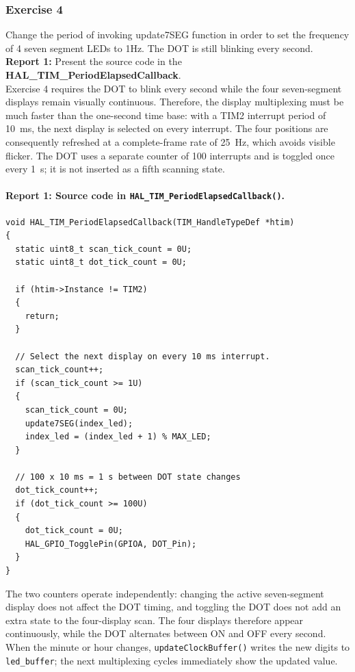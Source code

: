 \subsubsection{Exercise 4}

Change the period of invoking update7SEG function in order to set the frequency of 4 seven segment LEDs to 1Hz. The DOT is still blinking every second.\\

\textbf{Report 1: } Present the source code in the \textbf{HAL\_TIM\_PeriodElapsedCallback}. \\

Exercise 4 requires the DOT to blink every second while the four seven-segment displays remain visually continuous. Therefore, the display multiplexing must be much faster than the one-second time base: with a TIM2 interrupt period of \SI{10}{ms}, the next display is selected on every interrupt. The four positions are consequently refreshed at a complete-frame rate of \SI{25}{Hz}, which avoids visible flicker. The DOT uses a separate counter of 100 interrupts and is toggled once every \SI{1}{s}; it is not inserted as a fifth scanning state.

\paragraph{Report 1: Source code in \texttt{HAL\_TIM\_PeriodElapsedCallback()}.}

\begin{lstlisting}[caption={Fast four-display multiplexing and a DOT toggled every second}]
void HAL_TIM_PeriodElapsedCallback(TIM_HandleTypeDef *htim)
{
  static uint8_t scan_tick_count = 0U;
  static uint8_t dot_tick_count = 0U;

  if (htim->Instance != TIM2)
  {
    return;
  }

  // Select the next display on every 10 ms interrupt.
  scan_tick_count++;
  if (scan_tick_count >= 1U)
  {
    scan_tick_count = 0U;
    update7SEG(index_led);
    index_led = (index_led + 1) % MAX_LED;
  }

  // 100 x 10 ms = 1 s between DOT state changes
  dot_tick_count++;
  if (dot_tick_count >= 100U)
  {
    dot_tick_count = 0U;
    HAL_GPIO_TogglePin(GPIOA, DOT_Pin);
  }
}
\end{lstlisting}

The two counters operate independently: changing the active seven-segment display does not affect the DOT timing, and toggling the DOT does not add an extra state to the four-display scan. The four displays therefore appear continuously, while the DOT alternates between ON and OFF every second. When the minute or hour changes, \texttt{updateClockBuffer()} writes the new digits to \texttt{led\_buffer}; the next multiplexing cycles immediately show the updated value.

